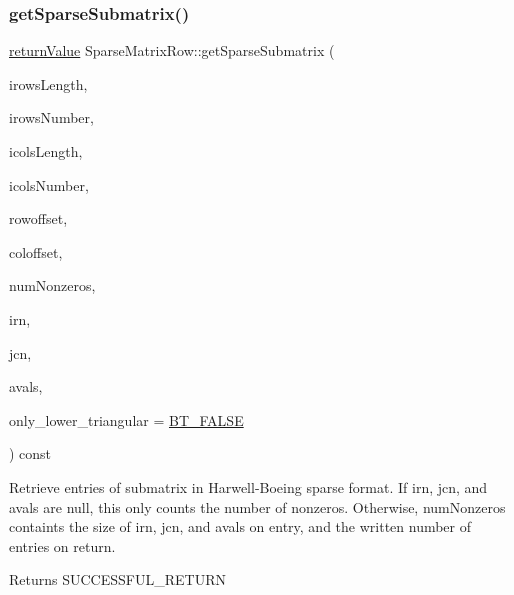 \subsubsection{\texorpdfstring{get\+Sparse\+Submatrix()}{getSparseSubmatrix()}}
{\footnotesize\ttfamily \hyperlink{_message_handling_8hpp_a81d556f613bfbabd0b1f9488c0fa865e}{return\+Value} Sparse\+Matrix\+Row\+::get\+Sparse\+Submatrix (\begin{DoxyParamCaption}\item[{\hyperlink{_types_8hpp_ab6fd6105e64ed14a0c9281326f05e623}{int\+\_\+t}}]{irows\+Length,  }\item[{const \hyperlink{_types_8hpp_ab6fd6105e64ed14a0c9281326f05e623}{int\+\_\+t} $\ast$const}]{irows\+Number,  }\item[{\hyperlink{_types_8hpp_ab6fd6105e64ed14a0c9281326f05e623}{int\+\_\+t}}]{icols\+Length,  }\item[{const \hyperlink{_types_8hpp_ab6fd6105e64ed14a0c9281326f05e623}{int\+\_\+t} $\ast$const}]{icols\+Number,  }\item[{\hyperlink{_types_8hpp_ab6fd6105e64ed14a0c9281326f05e623}{int\+\_\+t}}]{rowoffset,  }\item[{\hyperlink{_types_8hpp_ab6fd6105e64ed14a0c9281326f05e623}{int\+\_\+t}}]{coloffset,  }\item[{\hyperlink{_types_8hpp_ab6fd6105e64ed14a0c9281326f05e623}{int\+\_\+t} \&}]{num\+Nonzeros,  }\item[{\hyperlink{_types_8hpp_ab6fd6105e64ed14a0c9281326f05e623}{int\+\_\+t} $\ast$}]{irn,  }\item[{\hyperlink{_types_8hpp_ab6fd6105e64ed14a0c9281326f05e623}{int\+\_\+t} $\ast$}]{jcn,  }\item[{\hyperlink{qp_o_a_s_e_s__wrapper_8h_a0d00e2b3dfadee81331bbb39068570c4}{real\+\_\+t} $\ast$}]{avals,  }\item[{\hyperlink{_types_8hpp_a20f82124c82b6f5686a7fce454ef9089}{Boolean\+Type}}]{only\+\_\+lower\+\_\+triangular = {\ttfamily \hyperlink{_types_8hpp_a20f82124c82b6f5686a7fce454ef9089a85b8a20e72a8bea5dd10a6007fe3071e}{B\+T\+\_\+\+F\+A\+L\+SE}} }\end{DoxyParamCaption}) const\hspace{0.3cm}{\ttfamily [virtual]}}

Retrieve entries of submatrix in Harwell-\/\+Boeing sparse format. If irn, jcn, and avals are null, this only counts the number of nonzeros. Otherwise, num\+Nonzeros containts the size of irn, jcn, and avals on entry, and the written number of entries on return. \begin{DoxyReturn}{Returns}
S\+U\+C\+C\+E\+S\+S\+F\+U\+L\+\_\+\+R\+E\+T\+U\+RN 
\end{DoxyReturn}

